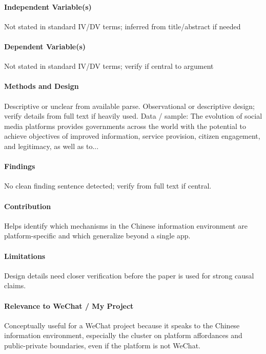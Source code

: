 \documentclass[12pt]{article}
\begin{document}
\paragraph{Independent Variable(s)} Not stated in standard IV/DV terms; inferred from title/abstract if needed

\paragraph{Dependent Variable(s)} Not stated in standard IV/DV terms; verify if central to argument

\paragraph{Methods and Design} Descriptive or unclear from available parse. Observational or descriptive design; verify details from full text if heavily used. Data / sample: The evolution of social media platforms provides governments across the world with the potential to achieve objectives of improved information, service provision, citizen engagement, and legitimacy, as well as to...

\paragraph{Findings} No clean finding sentence detected; verify from full text if central.

\paragraph{Contribution} Helps identify which mechanisms in the Chinese information environment are platform-specific and which generalize beyond a single app.

\paragraph{Limitations} Design details need closer verification before the paper is used for strong causal claims.

\paragraph{Relevance to WeChat / My Project} Conceptually useful for a WeChat project because it speaks to the Chinese information environment, especially the cluster on platform affordances and public-private boundaries, even if the platform is not WeChat.
\end{document}
